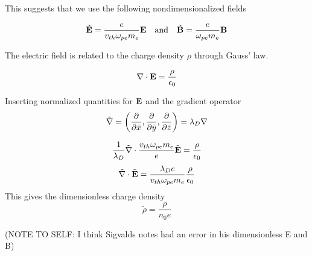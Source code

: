         This suggests that we use the following nondimensionalized fields

        \begin{equation}
            \tilde{\vb{E}} = \frac{e}{v_{th}\omega_{pe}m_e}\vb{E} \quad{\text{and}} \quad \tilde{\vb{B}} = \frac{e}{\omega_{pe}m_e}\vb{B}
        \end{equation}

        The electric field is related to the charge density \(\rho\) through Gauss'
        law.

        \begin{equation}
            \nabla \cdot \vb{E} = \frac{\rho}{\epsilon_0}
        \end{equation}

        Inserting normalized quantities for \(\vb{E}\) and the gradient operator
        \[\tilde{\nabla}=\left(\pdv{\tilde x}, \pdv{\tilde y} , \pdv{\tilde z}\right) = \lambda_D \nabla\]

        \begin{equation}
            \frac{1}{\lambda_D}\tilde\nabla \cdot \frac{v_{th}\omega_{pe}m_e}{e}\tilde{\vb{E}} = \frac{\rho}{\epsilon_0}
        \end{equation}
        \begin{equation}
            \tilde\nabla \cdot\tilde{\vb{E}} = \frac{\lambda_De}{v_{th}\omega_{pe}m_e}\frac{\rho}{\epsilon_0}
        \end{equation}
        This gives the dimensionless charge density
        \begin{equation}
            \tilde \rho = \frac{\rho}{n_0e}
        \end{equation}

        (NOTE TO SELF: I think Sigvalds notes had an error in his dimensionless E and B)


